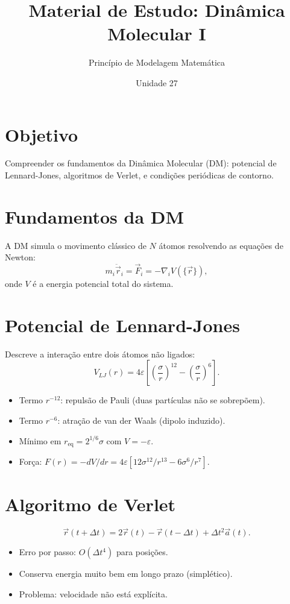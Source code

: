 \documentclass[12pt,a4paper]{article}
\title{Material de Estudo: Din\^amica Molecular I}
\author{Princ\'ipio de Modelagem Matem\'atica}
\date{Unidade 27}
\begin{document}
\maketitle

\section*{Objetivo}
Compreender os fundamentos da Din\^amica Molecular (DM): potencial de Lennard-Jones, algoritmos de Verlet, e condi\c{c}\~oes peri\'odicas de contorno.

\section*{Fundamentos da DM}

A DM simula o movimento cl\'assico de $N$ \'atomos resolvendo as equa\c{c}\~oes de Newton:
\[
m_i\ddot{\vec{r}}_i = \vec{F}_i = -\nabla_i V(\{\vec{r}\}),
\]
onde $V$ \'e a energia potencial total do sistema.

\section*{Potencial de Lennard-Jones}

Descreve a intera\c{c}\~ao entre dois \'atomos n\~ao ligados:
\[
V_{LJ}(r) = 4\varepsilon\!\left[\left(\frac{\sigma}{r}\right)^{12} - \left(\frac{\sigma}{r}\right)^6\right].
\]
\begin{itemize}
  \item Termo $r^{-12}$: repuls\~ao de Pauli (duas part\'iculas n\~ao se sobrepõem).
  \item Termo $r^{-6}$: atra\c{c}\~ao de van der Waals (dipolo induzido).
  \item M\'inimo em $r_\text{eq} = 2^{1/6}\sigma$ com $V = -\varepsilon$.
  \item For\c{c}a: $F(r) = -dV/dr = 4\varepsilon[12\sigma^{12}/r^{13} - 6\sigma^6/r^7]$.
\end{itemize}

\section*{Algoritmo de Verlet}

\[
\vec{r}(t+\Delta t) = 2\vec{r}(t) - \vec{r}(t-\Delta t) + \Delta t^2 \vec{a}(t).
\]
\begin{itemize}
  \item Erro por passo: $O(\Delta t^4)$ para posi\c{c}\~oes.
  \item Conserva energia muito bem em longo prazo (simpl\'etico).
  \item Problema: velocidade n\~ao est\'a expl\'icita.
\end{itemize}
\end{document}
